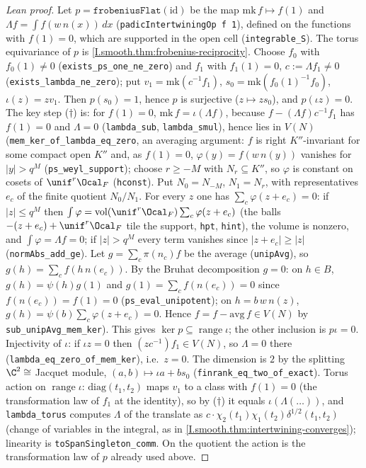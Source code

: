 \begin{proof}[Lean proof]
Let $p=\texttt{frobeniusFlat}(\mathrm{id})$ be the map $\mathrm{mk}\,f\mapsto f(1)$ and $\Lambda f=\int f(w\,n(x))\,dx$ (\texttt{padicIntertwiningOp f 1}), defined on the functions with $f(1)=0$, which are supported in the open cell (\texttt{integrable\_S}). The torus equivariance of $p$ is \cref{I.smooth.thm:frobenius-reciprocity}. Choose $f_0$ with $f_0(1)\ne0$ (\texttt{exists\_ps\_one\_ne\_zero}) and $f_1$ with $f_1(1)=0$, $c:=\Lambda f_1\ne0$ (\texttt{exists\_lambda\_ne\_zero}); put $v_1=\mathrm{mk}(c^{-1}f_1)$, $s_0=\mathrm{mk}(f_0(1)^{-1}f_0)$, $\iota(z)=zv_1$. Then $p(s_0)=1$, hence $p$ is surjective ($z\mapsto z s_0$), and $p(\iota z)=0$. The key step ($\dagger$) is: for $f(1)=0$, $\mathrm{mk}\,f=\iota(\Lambda f)$, because $f-(\Lambda f)c^{-1}f_1$ has $f(1)=0$ and $\Lambda=0$ (\texttt{lambda\_sub}, \texttt{lambda\_smul}), hence lies in $V(N)$ (\texttt{mem\_ker\_of\_lambda\_eq\_zero}, an averaging argument: $f$ is right $K''$-invariant for some compact open $K''$ and, as $f(1)=0$, $\varphi(y)=f(w\,n(y))$ vanishes for $|y|>q^{M}$ (\texttt{ps\_weyl\_support}); choose $r\ge-M$ with $N_r\subseteq K''$, so $\varphi$ is constant on cosets of $\unif^r\Ocal_F$ (\texttt{hconst}). Put $N_0=N_{-M}$, $N_1=N_r$, with representatives $e_c$ of the finite quotient $N_0/N_1$. For every $z$ one has $\sum_c\varphi(z+e_c)=0$: if $|z|\le q^M$ then $\int\varphi=\mathrm{vol}(\unif^r\Ocal_F)\sum_c\varphi(z+e_c)$ (the balls $-(z+e_c)+\unif^r\Ocal_F$ tile the support, \texttt{hpt}, \texttt{hint}), the volume is nonzero, and $\int\varphi=\Lambda f=0$; if $|z|>q^M$ every term vanishes since $|z+e_c|\ge|z|$ (\texttt{normAbs\_add\_ge}). Let $g=\sum_c\pi(n_c)f$ be the average (\texttt{unipAvg}), so $g(h)=\sum_c f(h\,n(e_c))$. By the Bruhat decomposition $g=0$: on $h\in B$, $g(h)=\psi(h)g(1)$ and $g(1)=\sum_cf(n(e_c))=0$ since $f(n(e_c))=f(1)=0$ (\texttt{ps\_eval\_unipotent}); on $h=b\,w\,n(z)$, $g(h)=\psi(b)\sum_c\varphi(z+e_c)=0$. Hence $f=f-\mathrm{avg}\,f\in V(N)$ by \texttt{sub\_unipAvg\_mem\_ker}). This gives $\ker p\subseteq\operatorname{range}\iota$; the other inclusion is $p\iota=0$. Injectivity of $\iota$: if $\iota z=0$ then $(zc^{-1})f_1\in V(N)$, so $\Lambda=0$ there (\texttt{lambda\_eq\_zero\_of\_mem\_ker}), i.e.\ $z=0$. The dimension is $2$ by the splitting $\C^2\cong$ Jacquet module, $(a,b)\mapsto\iota a+b s_0$ (\texttt{finrank\_eq\_two\_of\_exact}). Torus action on $\operatorname{range}\iota$: $\mathrm{diag}(t_1,t_2)$ maps $v_1$ to a class with $f(1)=0$ (the transformation law of $f_1$ at the identity), so by ($\dagger$) it equals $\iota(\Lambda(\ldots))$, and \texttt{lambda\_torus} computes $\Lambda$ of the translate as $c\cdot\chi_2(t_1)\chi_1(t_2)\delta^{1/2}(t_1,t_2)$ (change of variables in the integral, as in \cref{I.smooth.thm:intertwining-converges}); linearity is \texttt{toSpanSingleton\_comm}. On the quotient the action is the transformation law of $p$ already used above.
\end{proof}

